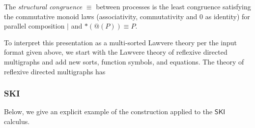\documentclass{llncs}
\renewcommand{\:}{\colon}
\newcommand{\pzero}{\mathbin{0}}
\begin{document}
\begin{definition}
  The {\em structural congruence} $\equiv$
  between processes \cite{SangiorgiWalker} is the least congruence
  satisfying the commutative monoid laws
  (associativity, commutativity and $\pzero$ as identity) for parallel
  composition $|$ and $*(@(P)) \equiv P$.
\end{definition}

To interpret this presentation as a multi-sorted Lawvere theory per
the input format given above, we start with the Lawvere theory of
reflexive directed multigraphs and add new sorts, function symbols,
and equations.  The theory of reflexive directed multigraphs has








\subsubsection{SKI}
Below, we give an explicit example of the construction applied to the $\mathsf{SKI}$ calculus.


\end{document}
